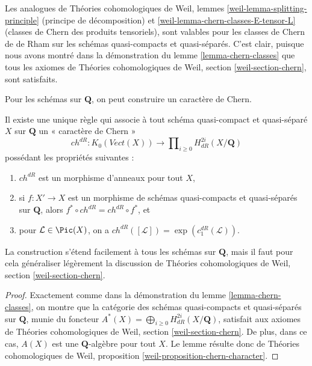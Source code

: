 \begin{remark}
\label{remark-splitting-principle}
Les analogues de Théories cohomologiques de Weil, lemmes
\ref{weil-lemma-splitting-principle} (principe de décomposition) et
\ref{weil-lemma-chern-classes-E-tensor-L} (classes de Chern des produits tensoriels),
sont valables pour les classes de Chern de de Rham sur les schémas quasi-compacts et quasi-séparés.
C'est clair, puisque nous avons montré dans la démonstration du
lemme \ref{lemma-chern-classes}
que tous les axiomes de Théories cohomologiques de Weil, section
\ref{weil-section-chern}, sont satisfaits.
\end{remark}

\noindent
Pour les schémas sur $\mathbf{Q}$, on peut construire un caractère de Chern.

\begin{lemma}
\label{lemma-chern-character}
Il existe une unique règle qui associe à tout schéma quasi-compact et quasi-séparé
$X$ sur $\mathbf{Q}$ un « caractère de Chern »
$$
ch^{dR} : K_0(\textit{Vect}(X)) \longrightarrow
\prod\nolimits_{i \geq 0} H_{dR}^{2i}(X/\mathbf{Q})
$$
possédant les propriétés suivantes :
\begin{enumerate}
\item $ch^{dR}$ est un morphisme d'anneaux pour tout $X$,
\item si $f : X' \to X$ est un morphisme de schémas quasi-compacts et quasi-séparés
sur $\mathbf{Q}$, alors $f^* \circ ch^{dR} =  ch^{dR} \circ f^*$, et
\item pour $\mathcal{L} \in \Pic(X)$,
on a $ch^{dR}([\mathcal{L}]) = \exp(c_1^{dR}(\mathcal{L}))$.
\end{enumerate}
\end{lemma}

\noindent
La construction s'étend facilement à tous les schémas sur $\mathbf{Q}$,
mais il faut pour cela généraliser légèrement la discussion de
Théories cohomologiques de Weil, section \ref{weil-section-chern}.

\begin{proof}
Exactement comme dans la démonstration du lemme \ref{lemma-chern-classes},
on montre que la catégorie des schémas quasi-compacts et quasi-séparés
sur $\mathbf{Q}$, munie du foncteur
$A^*(X) = \bigoplus_{i \geq 0} H_{dR}^{2i}(X/\mathbf{Q})$,
satisfait aux axiomes de
Théories cohomologiques de Weil, section \ref{weil-section-chern}.
De plus, dans ce cas, $A(X)$ est une $\mathbf{Q}$-algèbre pour
tout $X$. Le lemme résulte donc de
Théories cohomologiques de Weil, proposition
\ref{weil-proposition-chern-character}.
\end{proof}







